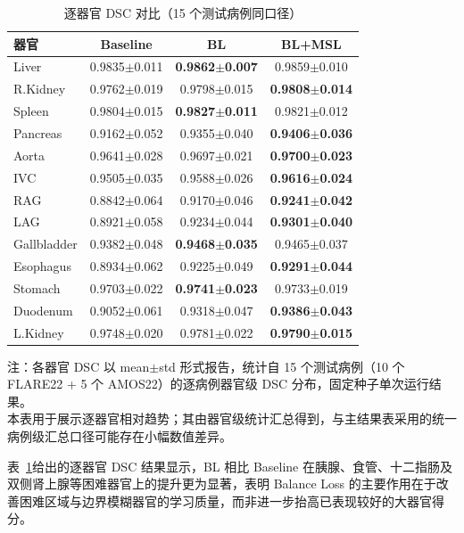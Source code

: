 \begin{table}[htbp]
  \centering
  \caption{逐器官 DSC 对比（15 个测试病例同口径）}
  \label{tab:per_organ_dsc}
  \small
  \begin{tabular}{lccc}
    \hline
    器官 & Baseline & BL & BL+MSL \\
    \hline
    Liver          & 0.9835$\pm$0.011 & \textbf{0.9862$\pm$0.007} & 0.9859$\pm$0.010 \\
    R.Kidney       & 0.9762$\pm$0.019 & 0.9798$\pm$0.015 & \textbf{0.9808$\pm$0.014} \\
    Spleen         & 0.9804$\pm$0.015 & \textbf{0.9827$\pm$0.011} & 0.9821$\pm$0.012 \\
    Pancreas       & 0.9162$\pm$0.052 & 0.9355$\pm$0.040 & \textbf{0.9406$\pm$0.036} \\
    Aorta          & 0.9641$\pm$0.028 & 0.9697$\pm$0.021 & \textbf{0.9700$\pm$0.023} \\
    IVC            & 0.9505$\pm$0.035 & 0.9588$\pm$0.026 & \textbf{0.9616$\pm$0.024} \\
    RAG            & 0.8842$\pm$0.064 & 0.9170$\pm$0.046 & \textbf{0.9241$\pm$0.042} \\
    LAG            & 0.8921$\pm$0.058 & 0.9234$\pm$0.044 & \textbf{0.9301$\pm$0.040} \\
    Gallbladder    & 0.9382$\pm$0.048 & \textbf{0.9468$\pm$0.035} & 0.9465$\pm$0.037 \\
    Esophagus      & 0.8934$\pm$0.062 & 0.9225$\pm$0.049 & \textbf{0.9291$\pm$0.044} \\
    Stomach        & 0.9703$\pm$0.022 & \textbf{0.9741$\pm$0.023} & 0.9733$\pm$0.019 \\
    Duodenum       & 0.9052$\pm$0.061 & 0.9318$\pm$0.047 & \textbf{0.9386$\pm$0.043} \\
    L.Kidney       & 0.9748$\pm$0.020 & 0.9781$\pm$0.022 & \textbf{0.9790$\pm$0.015} \\
    \hline
  \end{tabular}
  \vspace{2pt}
  \parbox{\textwidth}{\footnotesize 注：各器官 DSC 以 mean$\pm$std 形式报告，统计自 15 个测试病例（10 个 FLARE22 + 5 个 AMOS22）的逐病例器官级 DSC 分布，固定种子单次运行结果。\\
  本表用于展示逐器官相对趋势；其由器官级统计汇总得到，与主结果表采用的统一病例级汇总口径可能存在小幅数值差异。}
\end{table}

表~\ref{tab:per_organ_dsc}给出的逐器官 DSC 结果显示，BL 相比 Baseline 在胰腺、食管、十二指肠及双侧肾上腺等困难器官上的提升更为显著，表明 Balance Loss 的主要作用在于改善困难区域与边界模糊器官的学习质量，而非进一步抬高已表现较好的大器官得分。

